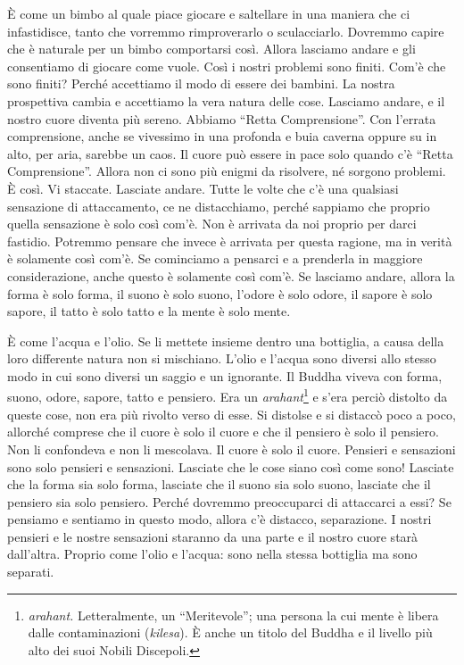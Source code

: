 È come un bimbo al quale piace giocare e saltellare in una maniera che
ci infastidisce, tanto che vorremmo rimproverarlo o sculacciarlo.
Dovremmo capire che è naturale per un bimbo comportarsi così. Allora
lasciamo andare e gli consentiamo di giocare come vuole. Così i nostri
problemi sono finiti. Com'è che sono finiti? Perché accettiamo il modo
di essere dei bambini. La nostra prospettiva cambia e accettiamo la vera
natura delle cose. Lasciamo andare, e il nostro cuore diventa più
sereno. Abbiamo ``Retta Comprensione''. Con l'errata comprensione, anche
se vivessimo in una profonda e buia caverna oppure su in alto, per aria,
sarebbe un caos. Il cuore può essere in pace solo quando c'è ``Retta
Comprensione''. Allora non ci sono più enigmi da risolvere, né sorgono
problemi. È così. Vi staccate. Lasciate andare. Tutte le volte che c'è
una qualsiasi sensazione di attaccamento, ce ne distacchiamo, perché
sappiamo che proprio quella sensazione è solo così com'è. Non è arrivata
da noi proprio per darci fastidio. Potremmo pensare che invece è
arrivata per questa ragione, ma in verità è solamente così com'è. Se
cominciamo a pensarci e a prenderla in maggiore considerazione, anche
questo è solamente così com'è. Se lasciamo andare, allora la forma è
solo forma, il suono è solo suono, l'odore è solo odore, il sapore è
solo sapore, il tatto è solo tatto e la mente è solo mente.

È come l'acqua e l'olio. Se li mettete insieme dentro una bottiglia, a
causa della loro differente natura non si mischiano. L'olio e l'acqua
sono diversi allo stesso modo in cui sono diversi un saggio e un
ignorante. Il Buddha viveva con forma, suono, odore, sapore, tatto e
pensiero. Era un \emph{arahant}\footnote{\emph{arahant.} Letteralmente,
  un ``Meritevole''; una persona la cui mente è libera dalle
  contaminazioni (\emph{kilesa}). È anche un titolo del Buddha e il
  livello più alto dei suoi Nobili Discepoli.} e s'era perciò distolto
da queste cose, non era più rivolto verso di esse. Si distolse e si
distaccò poco a poco, allorché comprese che il cuore è solo il cuore e
che il pensiero è solo il pensiero. Non li confondeva e non li
mescolava. Il cuore è solo il cuore. Pensieri e sensazioni sono solo
pensieri e sensazioni. Lasciate che le cose siano così come sono!
Lasciate che la forma sia solo forma, lasciate che il suono sia solo
suono, lasciate che il pensiero sia solo pensiero. Perché dovremmo
preoccuparci di attaccarci a essi? Se pensiamo e sentiamo in questo
modo, allora c'è distacco, separazione. I nostri pensieri e le nostre
sensazioni staranno da una parte e il nostro cuore starà dall'altra.
Proprio come l'olio e l'acqua: sono nella stessa bottiglia ma sono
separati.

